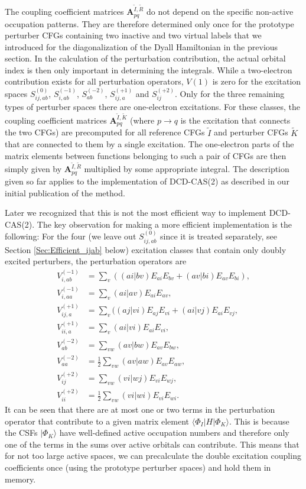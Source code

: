 The coupling coefficient matrices $\mathbf{A}_{pq}^{\tilde I,\tilde R}$ do not depend on the specific non-active occupation patterns. They are therefore determined only once for the prototype perturber CFGs containing two inactive and two virtual labels that we introduced for the diagonalization of the Dyall Hamiltonian in the previous section. In the calculation of the perturbation contribution, the actual orbital index is then only important in determining the integrals.
While a two-electron contribution exists for all perturbation operators, $V(1)$ is zero for the excitation spaces $S_{ij,ab}^{(0)}$, $S_{i,ab}^{( - 1)}$, $S_{ab}^{( - 2)}$, $S_{ij,a}^{( + 1)}$ and $S_{ij}^{( + 2)}$.
Only for the three remaining types of perturber spaces there are one-electron excitations. For these classes, the coupling coefficient matrices $\mathbf{A}_{pq}^{\tilde I,\tilde K}$ (where $p \to q$ is the excitation that connects the two CFGs) are precomputed for all reference CFGs $\tilde I$ and perturber CFGs $\tilde K$ that are connected to them by a single excitation. The one-electron parts of the matrix elements between functions belonging to such a pair of CFGs are then simply given by $\mathbf{A}_{pq}^{\tilde I,\tilde R}$ multiplied by some appropriate integral. The description given so far applies to the implementation of DCD-CAS(2) as described in our initial publication of the method.\cite{PathaLN_2017_234109}

Later we recognized that this is not the most efficient way to implement DCD-CAS(2).
The key observation for making a more efficient implementation is the following:
For the four (we leave out $S_{ij,ab}^{(0)}$ since it is treated separately, see Section \ref{Sec:Efficient_ijab} below) excitation classes that contain only doubly excited perturbers,
the perturbation operators are
\begin{align}
  V_{i, ab}^{(-1)} &= \sum_v ((ai|bv) E_{ai} E_{bv} + (av|bi) E_{av} E_{bi}), \\
  V_{i, aa}^{(-1)} &= \sum_v (ai|av) E_{ai} E_{av}, \\
  V_{ij, a}^{(+1)} &= \sum_v ((aj|vi) E_{aj} E_{vi} + (ai|vj) E_{ai} E_{vj}, \\
  V_{ii, a}^{(+1)} &= \sum_v (ai|vi) E_{ai} E_{vi}, \\
  V_{ab}^{(-2)} &= \sum_{vw} (av|bw) E_{av} E_{bw}, \\
  V_{aa}^{(-2)} &= \frac{1}{2} \sum_{vw} (av|aw) E_{av} E_{aw}, \\
  V_{ij}^{(+2)} &= \sum_{vw} (vi|wj) E_{vi} E_{wj}, \\
  V_{ii}^{(+2)} &= \frac{1}{2} \sum_{vw} (vi|wi) E_{vi} E_{wi}.
\end{align}
It can be seen that there are at most one or two terms in the perturbation operator that contribute
to a given matrix element $\langle \Phi_I | H | \Phi_K \rangle$. This is because the CSFs $|\Phi_K\rangle$ have well-defined active occupation numbers and therefore only one of the terms in the sums over active orbitals can contribute. This means
that for not too large active spaces, we can precalculate the double excitation
coupling coefficients once (using the prototype perturber spaces) and hold them in memory.

